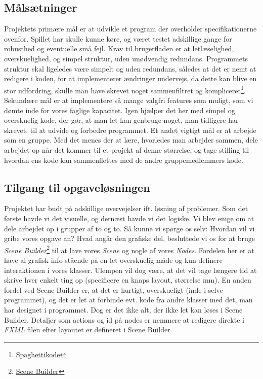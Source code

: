 \subsection{Målsætninger}\label{MS}
Projektets primære mål er at udvikle et program der overholder specifikationerne ovenfor. Spillet har skulle kunne køre, og været testet adskillige gange for robusthed og eventuelle små fejl.\newline
Krav til brugerfladen er at letlæselighed, overskuelighed, og simpel struktur, uden unødvendig redundans.\newline
Programmets struktur skal ligeledes være simpelt og uden redundans, således at det er nemt at redigere i koden, for at implementerer ændringer undervejs, da dette kan blive en stor udfordring, skulle man have skrevet noget sammenfiltret og kompliceret\footnote{\href{https://www.wikiwand.com/en/Spaghetti_code}{Spaghettikode}}.\newline
Sekundære mål er at implementere så mange valgfri features som muligt, som vi dømte inde for vores faglige kapacitet. Igen hjælper det her med simpel og overskuelig kode, der gør, at man let kan genbruge noget, man tidligere har skrevet, til at udvide og forbedre programmet.\newline
Et andet vigtigt mål er at arbejde som en gruppe. Med det menes der at lære, hvorledes man arbejder sammen, dele arbejdet op når det kommer til et projekt af denne størrelse, og tage stilling til hvordan ens kode kan sammenflettes med de andre gruppemedlemmers kode.
\subsection{Tilgang til opgaveløsningen}\label{TTO}
Projektet har budt på adskillige overvejelser ift. løsning af problemer. Som det første havde vi det visuelle, og dernæst havde vi det logiske. Vi blev enige om at dele arbejdet op i grupper af to og to. Så kunne vi spørge os selv: Hvordan vil vi gribe vores opgave an? Hvad angår den grafiske del, besluttede vi os for at bruge \emph{Scene Builder}\footnote{\href{https://gluonhq.com/products/scene-builder/}{Scene Builder}} til at lave vores \emph{Scene} og nogle af vores \emph{Nodes}. Fordelen her er at have al grafisk info stående på en let overskuelig måde og kun definere interaktionen i vores klasser. Ulempen vil dog være, at det vil tage længere tid at skrive hver enkelt ting op (specificere en knaps layout, størrelse mm). En anden fordel ved Scene Builder er, at det er hurtigt, overskueligt (inde i selve programmet), og det er let at forbinde evt. kode fra andre klasser med det, man har designet i programmet. Dog er det ikke alt, der ikke let kan løses i Scene Builder. Detaljer som actions og id på nodes er nemmere at redigere direkte i \emph{FXML} filen efter layoutet er defineret i Scene Builder.